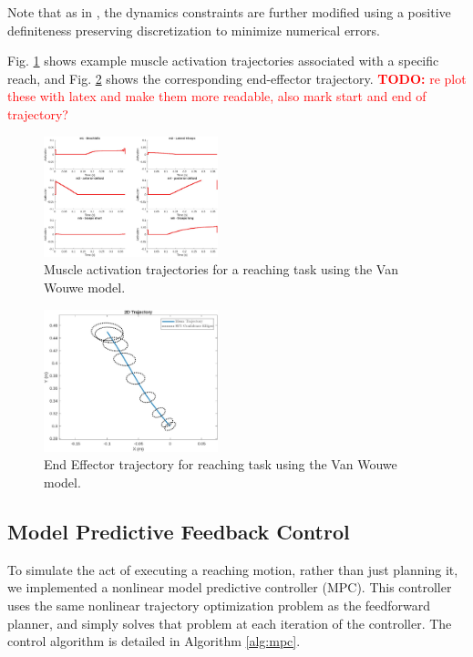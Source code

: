 \documentclass[letterpaper, 10pt, conference]{ieeeconf}
\newcommand{\todo}[1]{\textcolor{red}{\textbf{TODO:} #1}}
\begin{document}
Note that as in \cite{stochastic_model}, the dynamics constraints are further modified using a positive definiteness preserving discretization to minimize numerical errors.

Fig. \ref{fig:demo_activations} shows example muscle activation trajectories associated with a specific reach, and Fig. \ref{fig:demo_position} shows the corresponding end-effector trajectory.
\todo{re plot these with latex and make them more readable, also mark start and end of trajectory?}
\begin{figure}
    \centering
    \includegraphics[width=0.45\textwidth]{images/demo_activations_small.jpg}
    \caption{Muscle activation trajectories for a reaching task using the Van Wouwe model.}
    \label{fig:demo_activations}
\end{figure}

\begin{figure}
    \centering
    \includegraphics[width=0.45\textwidth]{images/demo_traj_small.jpg}
    \caption{End Effector trajectory for reaching task using the Van Wouwe model.}
    \label{fig:demo_position}
\end{figure}


\subsection{Model Predictive Feedback Control}
To simulate the act of executing a reaching motion, rather than just planning it, we implemented a nonlinear model predictive controller (MPC). This controller uses the same nonlinear trajectory optimization problem as the feedforward planner, and simply solves that problem at each iteration of the controller. The control algorithm is detailed in Algorithm \ref{alg:mpc}.
\end{document}
